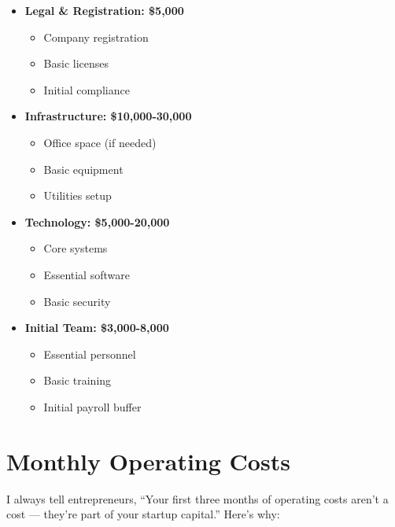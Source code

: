 \begin{tcolorbox}[colback=white,colframe=primarydark,title=\textbf{Core Setup Components}]
\begin{itemize}
    \item \textbf{Legal \& Registration: \$5,000}
    \begin{itemize}
        \item Company registration
        \item Basic licenses
        \item Initial compliance
    \end{itemize}

    \item \textbf{Infrastructure: \$10,000-30,000}
    \begin{itemize}
        \item Office space (if needed)
        \item Basic equipment
        \item Utilities setup
    \end{itemize}

    \item \textbf{Technology: \$5,000-20,000}
    \begin{itemize}
        \item Core systems
        \item Essential software
        \item Basic security
    \end{itemize}

    \item \textbf{Initial Team: \$3,000-8,000}
    \begin{itemize}
        \item Essential personnel
        \item Basic training
        \item Initial payroll buffer
    \end{itemize}
\end{itemize}
\end{tcolorbox}

\section{Monthly Operating Costs}\label{sec:monthly-operating-costs}

I always tell entrepreneurs, ``Your first three months of operating costs aren't a cost --- they're part of your startup capital.'' Here's why:

